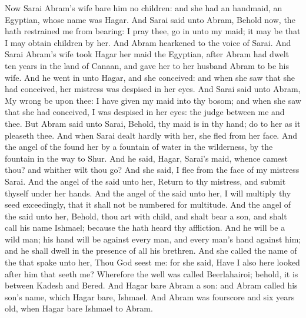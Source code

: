 \begin{biblechapter} %
 Now Sarai Abram's wife bare him no children: and she had an handmaid, an Egyptian, whose name was Hagar.
\verse And Sarai said unto Abram, Behold now, the \LORD hath restrained me from bearing: I pray thee, go in unto my maid; it may be that I may obtain children by her. And Abram hearkened to the voice of Sarai.
\verse And Sarai Abram's wife took Hagar her maid the Egyptian, after Abram had dwelt ten years in the land of Canaan, and gave her to her husband Abram to be his wife.
\verse And he went in unto Hagar, and she conceived: and when she saw that she had conceived, her mistress was despised in her eyes.
\verse And Sarai said unto Abram, My wrong be upon thee: I have given my maid into thy bosom; and when she saw that she had conceived, I was despised in her eyes: the \LORD judge between me and thee.
\verse But Abram said unto Sarai, Behold, thy maid is in thy hand; do to her as it pleaseth thee. And when Sarai dealt hardly with her, she fled from her face.
\verse And the angel of the \LORD found her by a fountain of water in the wilderness, by the fountain in the way to Shur.
\verse And he said, Hagar, Sarai's maid, whence camest thou? and whither wilt thou go? And she said, I flee from the face of my mistress Sarai.
\verse And the angel of the \LORD said unto her, Return to thy mistress, and submit thyself under her hands.
\verse And the angel of the \LORD said unto her, I will multiply thy seed exceedingly, that it shall not be numbered for multitude.
\verse And the angel of the \LORD said unto her, Behold, thou art with child, and shalt bear a son, and shalt call his name Ishmael; because the \LORD hath heard thy affliction.
\verse And he will be a wild man; his hand will be against every man, and every man's hand against him; and he shall dwell in the presence of all his brethren.
\verse And she called the name of the \LORD that spake unto her, Thou God seest me: for she said, Have I also here looked after him that seeth me?
\verse Wherefore the well was called Beerlahairoi; behold, it is between Kadesh and Bered.
\verse And Hagar bare Abram a son: and Abram called his son's name, which Hagar bare, Ishmael.
\verse And Abram was fourscore and six years old, when Hagar bare Ishmael to Abram.
\end{biblechapter}

